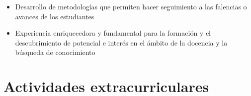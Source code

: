 \documentclass[11pt, letterpaper, sans]{moderncv}        %
\begin{document}
\begin{itemize}
{				{
					\vspace{3pt}
					\begin{itemize}
						\item Desarrollo de metodologías que permiten hacer seguimiento a las falencias o avances de los estudiantes
						\item Experiencia enriquecedora y fundamental para la formaci\'on y el descubrimiento de potencial e inter\'es en el \'ambito de la docencia y la b\'usqueda de conocimiento
					\end{itemize}
				}
			}
			\vspace{6pt}
			
		\end{itemize}
	\vspace{6pt}
\section{Actividades extracurriculares}
\end{document}
